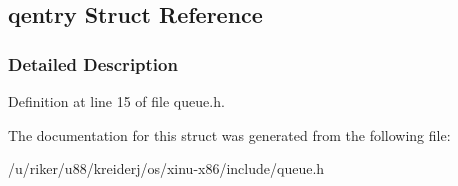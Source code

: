 \hypertarget{structqentry}{}\subsection{qentry Struct Reference}
\label{structqentry}


\subsubsection{Detailed Description}


Definition at line 15 of file queue.\+h.



The documentation for this struct was generated from the following file\+:\begin{DoxyCompactItemize}
\item 
/u/riker/u88/kreiderj/os/xinu-\/x86/include/queue.\+h\end{DoxyCompactItemize}
